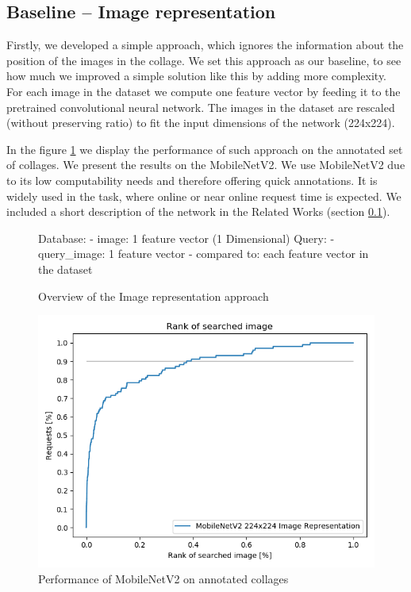 \subsection{Baseline -- Image representation}

Firstly, we developed a simple approach, which ignores the information about the position of the images in the collage. We set this approach as our baseline, to see how much we improved a simple solution like this by adding more complexity. For each image in the dataset we compute one feature vector by feeding it to the pretrained convolutional neural network. The images in the dataset are rescaled (without preserving ratio) to fit the input dimensions of the network (224x224).

In the figure \ref{fig:mobilenet_whole_image} we display the performance of such approach on the annotated set of collages. We present the results on the MobileNetV2. We use MobileNetV2 due to its low computability needs and therefore offering quick annotations. It is widely used in the task, where online or near online request time is expected. We included a short description of the network in the Related Works (section \ref{}).

\begin{figure}
\centering
\begin{boxedverbatim}
Database:
    - image: 1 feature vector (1 Dimensional)
Query:
    - query_image: 1 feature vector
    - compared to: each feature vector in the dataset
\end{boxedverbatim}
\caption{Overview of the Image representation approach}
\end{figure}

\begin{figure}
    \centering
    \includegraphics[width=0.8\linewidth]{img/mobilenet_whole_image.png}
    \caption{Performance of MobileNetV2 on annotated collages}
    \label{fig:mobilenet_whole_image}
\end{figure}

